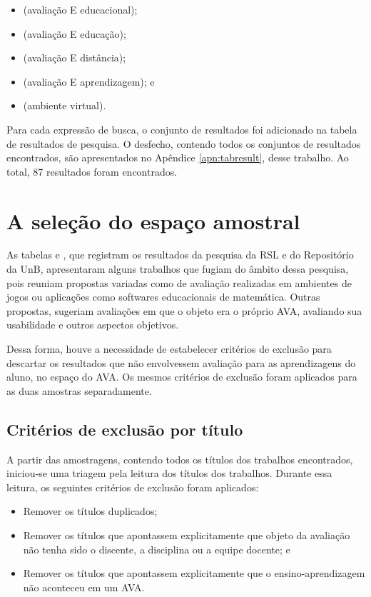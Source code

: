 \begin{itemize}
    \item (avaliação E educacional);
    \item (avaliação E educação);
    \item (avaliação E distância);
    \item (avaliação E aprendizagem); e
    \item (ambiente virtual).
\end{itemize}

Para cada expressão de busca, o conjunto de resultados foi adicionado na tabela de resultados de pesquisa. O desfecho, contendo todos os conjuntos de resultados encontrados, são apresentados no Apêndice \ref{apn:tabresult}, desse trabalho. Ao total, 87 resultados foram encontrados.

\section{A seleção do espaço amostral}%

As tabelas  e , que registram os resultados da pesquisa da RSL e do Repositório da UnB, apresentaram alguns trabalhos que fugiam do âmbito dessa pesquisa, pois reuniam propostas variadas como de avaliação realizadas em ambientes de jogos ou aplicações como softwares educacionais de matemática. Outras propostas, sugeriam avaliações em que o objeto era o próprio AVA, avaliando sua usabilidade e outros aspectos objetivos.

Dessa forma, houve a necessidade de estabelecer critérios de exclusão para descartar os resultados que não envolvessem avaliação para as aprendizagens do aluno, no espaço do AVA. Os mesmos critérios de exclusão foram aplicados para as duas amostras separadamente.

\subsection{Critérios de exclusão por título}%
A partir das amostragens, contendo todos os títulos dos trabalhos encontrados, iniciou-se uma triagem pela leitura dos títulos dos trabalhos. Durante essa leitura, os seguintes critérios de exclusão foram aplicados:
\begin{itemize}
    \item Remover os títulos duplicados;
    \item Remover os títulos que apontassem explicitamente que objeto da avaliação não tenha sido o discente, a disciplina ou a equipe docente; e
    \item Remover os títulos que apontassem explicitamente que o ensino-aprendizagem não aconteceu em um AVA.    
\end{itemize}

